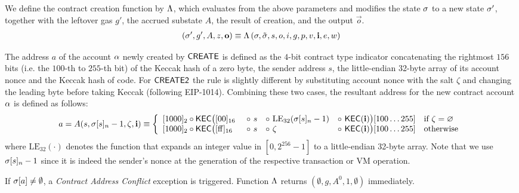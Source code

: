 We define the contract creation function by $\mathrm{\Lambda}$,
which evaluates from the above parameters and modifies the state $\mathbf{\sigma}$ to a new state $\mathbf{\sigma}'$, together with the leftover gas $g'$, the accrued substate $A$, the result of creation, and the output $\vec{o}$. 
\begin{align}
	\left(\mathbf{\sigma}',g', A, z, \mathbf{o} \right)\equiv \mathrm{\Lambda}\left(\mathbf{\sigma},\tilde{\mathbf{\sigma}}, s, o, i, g, p, v, \mathbf{i}, e, w \right)
\end{align}


The address $a$ of the account $\mathbf{\alpha}$ newly created by {\hyperlink{create}{$\mathsf{CREATE}$}} is defined as the $4$-bit contract type indicator concatenating the rightmost $156$ bits (i.e. the $100$-th to $255$-th bit) of the Keccak hash of a zero byte, the sender address $s$, the little-endian 32-byte array of its account nonce and the Keccak hash of \cvm code. 
% 
For {\hyperlink{create2}{$\mathsf{CREATE2}$}} the rule is slightly different by substituting account nonce with the salt $\zeta$ and changing the leading byte before taking Keccak (following EIP-1014).
Combining these two cases, 
the resultant address for the new contract account $\mathbf{\alpha}$ is defined as follows:
\begin{align}\label{eq:new-address}
	a= A(s, \st[s]_{n} - 1, \zeta, \vec{i}) \eqdef 
	\left\{\begin{array}{l l l l l}
	 	\typecontract \circ \kec\big([\mathrm{00}]_{16} &~\circ~ s &\circ~ \mathrm{LE}_{32}(\st[s]_n-1) &\circ~ \kec(\vec{i}) \big)[100 \dots 255]
	 	& \text{if}\ \zeta = \varnothing \\
	 	\typecontract \circ \kec\big([\mathrm{ff}]_{16} &~\circ~ s &\circ~  \zeta   &\circ~ \kec(\vec{i}) \big)[100 \dots 255] 
		& \text{otherwise}
	\end{array} \right.
\end{align}
where $\mathrm{LE}_{32}(\cdot)$ denotes the function that expands an integer value in $[0,2^{256}-1]$ to a little-endian 32-byte array. 
%
Note that we use $\mathbf{\sigma}[s]_n-1$ since it is indeed the sender's nonce at the generation of the respective transaction or VM operation. 

If $\mathbf{\sigma}[a]\neq \emptyset$, a \emph{Contract Address Conflict} exception is triggered. Function $\mathrm{\Lambda}$ returns $(\emptyset,g,A^0,1,\emptyset)$ immediately. 

